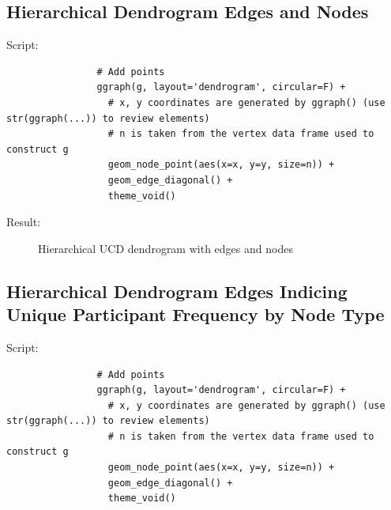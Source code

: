 \documentclass[10pt, letterpaper]{article}
\begin{document}
\begin{spacing}{1.0}
\subsection{Hierarchical Dendrogram Edges and Nodes}

Script:
\small
\begin{verbatim}
                # Add points
                ggraph(g, layout='dendrogram', circular=F) +
                  # x, y coordinates are generated by ggraph() (use str(ggraph(...)) to review elements)
                  # n is taken from the vertex data frame used to construct g
                  geom_node_point(aes(x=x, y=y, size=n)) +
                  geom_edge_diagonal() +
                  theme_void()
\end{verbatim}
\normalsize

Result:

\begin{figure}[H]
    \centering
    \caption{Hierarchical UCD dendrogram with edges and nodes}
    \label{fg:dend2}
\end{figure}

\subsection{Hierarchical Dendrogram Edges Indicing Unique Participant Frequency by Node Type}

Script:
\small
\begin{verbatim}
                # Add points
                ggraph(g, layout='dendrogram', circular=F) +
                  # x, y coordinates are generated by ggraph() (use str(ggraph(...)) to review elements)
                  # n is taken from the vertex data frame used to construct g
                  geom_node_point(aes(x=x, y=y, size=n)) +
                  geom_edge_diagonal() +
                  theme_void()
                

\end{verbatim}
\end{spacing}
\end{document}
